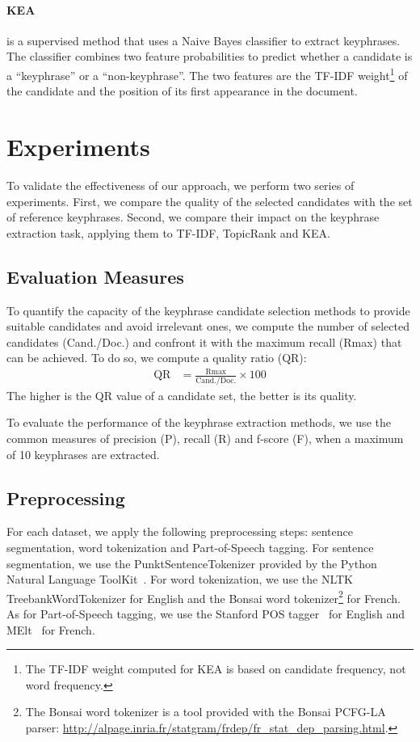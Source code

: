   \paragraph{KEA~\textnormal{\cite{witten1999kea}}} is a supervised method that
  uses a Naive Bayes classifier to extract keyphrases. The classifier combines
  two feature probabilities to predict whether a candidate is a ``keyphrase'' or
  a ``non-keyphrase''. The two features are the TF-IDF weight\footnote{The
    TF-IDF weight computed for KEA is based on candidate frequency, not word
  frequency.} of the candidate and the position of its first appearance in the
  document.

\section{Experiments}
\label{sec:evaluation}
  To validate the effectiveness of our approach, we perform two series of
  experiments. First, we compare the quality of the selected candidates with the
  set of reference keyphrases. Second, we compare their impact on the keyphrase
  extraction task, applying them to TF-IDF, TopicRank and KEA.

  \subsection{Evaluation Measures}
  \label{subsec:keyphrase_extraction_evaluation_measures}
    To quantify the capacity of the keyphrase candidate selection methods to
    provide suitable candidates and avoid irrelevant ones, we compute the
    number of selected candidates (Cand./Doc.) and confront it with the
    maximum recall (Rmax) that can be achieved. To do so, we compute a quality
    ratio (QR):
    \begin{align}
      \text{QR} &= \frac{\text{Rmax}}{\text{Cand./Doc.}} \times 100
    \end{align}
    The higher is the QR value of a candidate set, the better is its quality.

    To evaluate the performance of the keyphrase extraction methods, we use
    the common measures of precision (P), recall (R) and f-score (F), when a
    maximum of 10 keyphrases are extracted.

  \subsection{Preprocessing}
  \label{subsec:preprocessing}
    For each dataset, we apply the following preprocessing steps: sentence
    segmentation, word tokenization and Part-of-Speech tagging. For sentence
    segmentation, we use the PunktSentenceTokenizer provided by the Python
    Natural Language ToolKit~\cite[NLTK]{bird2009nltk}. For word tokenization,
    we use the NLTK TreebankWordTokenizer for English and the Bonsai word
    tokenizer\footnote{The Bonsai word tokenizer is a tool provided with the
    Bonsai PCFG-LA parser:
    \url{http://alpage.inria.fr/statgram/frdep/fr_stat_dep_parsing.html}.} for
    French. As for Part-of-Speech tagging, we use the Stanford
    POS tagger~\cite{toutanova2003stanfordpostagger} for English and
    MElt~\cite{denis2009melt} for French.

